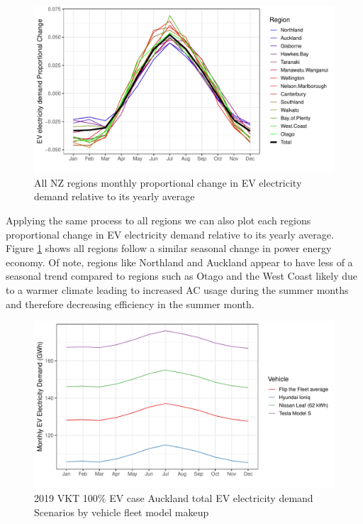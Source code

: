 \documentclass[
]{article}
\begin{document}
\begin{figure}
\centering
\includegraphics{final_report_files/figure-latex/NZ_region_power_prop-1.pdf}
\caption{All NZ regions monthly proportional change in EV electricity
demand relative to its yearly average\label{fig:NZ_region_power_prop}}
\end{figure}

Applying the same process to all regions we can also plot each regions
proportional change in EV electricity demand relative to its yearly
average. Figure \ref{fig:NZ_region_power_prop} shows all regions follow
a similar seasonal change in power energy economy. Of note, regions like
Northland and Auckland appear to have less of a seasonal trend compared
to regions such as Otago and the West Coast likely due to a warmer
climate leading to increased AC usage during the summer months and
therefore decreasing efficiency in the summer month.

\begin{figure}
\centering
\includegraphics{final_report_files/figure-latex/vehicle_power_usage_auck-1.pdf}
\caption{2019 VKT 100\% EV case Auckland total EV electricity demand
Scenarios by vehicle fleet model
makeup\label{fig:vehicle_power_usage_auck}}
\end{figure}
\end{document}
